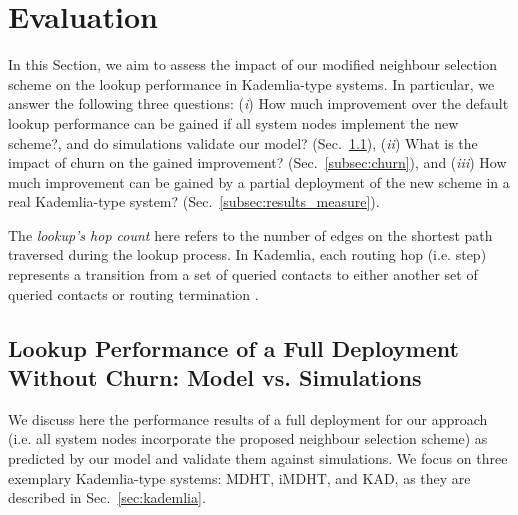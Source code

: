 \documentclass[10pt, conference, compsocconf, letterpaper]{IEEEtran}
\begin{document}
\section{Evaluation} \label{sec:results}

In this Section, we aim to assess the impact of our modified neighbour selection scheme on the lookup performance in Kademlia-type systems. In particular, we answer the following three questions: (\emph{i}) How much improvement over the default lookup performance can be gained if all system nodes implement the new scheme?, and do simulations validate our model? (Sec.~\ref{subsec:results_model_sim}), (\emph{ii}) What is the impact of churn on the gained  improvement? (Sec.~\ref{subsec:churn}), and (\emph{iii}) How much improvement can be gained by a partial deployment of the new scheme in a real Kademlia-type system? (Sec.~\ref{subsec:results_measure}). 

The \emph{lookup's hop count} here refers to the number of edges on the shortest path traversed during the lookup process. In Kademlia, each routing hop (i.e. step) represents a transition from a set of queried contacts to either another set of queried contacts or routing termination \cite{roos13comprehending}.




















\subsection{Lookup Performance of a Full Deployment Without Churn: Model vs. Simulations}
\label{subsec:results_model_sim}

We discuss here the performance results of a full deployment for our approach (i.e. all system nodes incorporate the proposed neighbour selection scheme) as predicted by our model and validate them against simulations. We focus on three exemplary Kademlia-type systems: MDHT, iMDHT, and KAD, as they are described in Sec.~\ref{sec:kademlia}.

\vspace{3pt}
\end{document}
